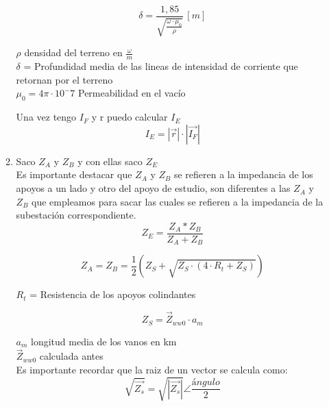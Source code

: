 \documentclass[10pt,a4paper]{article}
\begin{document}
\begin{itemize}
\begin{enumerate}
        $$
        \delta=\frac{1,85}{\sqrt{\frac{\omega \cdot \mu_{0}}{\rho}}} \,[m]
        $$
        
        $\rho$ densidad del terreno en $\frac{\omega}{m}$\\
        $\delta$ = Profundidad media de las lineas de intensidad de corriente que retornan por el terreno \\
        $\mu_{0} = 4\pi\cdot10^-7$ Permeabilidad en el vacío
        
        Una vez tengo $I_F$ y r puedo calcular $I_E$
        $$I_E = \left|\vec{r}\right| \cdot \left|\vec{I_F}\right|$$
        
        \item Saco $Z_A$ y $Z_B$ y con ellas saco $Z_E$
        \\
        
        Es importante destacar que $Z_A$ y $Z_B$ se refieren a la impedancia de los apoyos a un lado y otro del apoyo de estudio, son diferentes a las $Z_A$ y $Z_B$ que empleamos para sacar  las cuales se refieren a la impedancia de la subestación correspondiente.
        $$
        Z_{E}=\frac{Z_{A} * Z_{B}}{Z_{A}+Z_{B}}
        $$
        
        $$
        Z_{A}=Z_{B}=\frac{1}{2}\left(Z_{S}+\sqrt{Z_{S} \cdot\left(4 \cdot R_{t}+Z_{S}\right)}\right)
        $$
        
        $R_t$ = Resistencia de los apoyos colindantes
        
        $$
        Z_{S}=\vec{Z}_{w w 0} \cdot a_{m}
        $$
        
        $a_{m}$ longitud media de los vanos en km \\
        $\vec{Z}_{w w 0}$ calculada antes
        \\
        
        Es importante recordar que la raiz de un vector se calcula como:
        $$\sqrt{\vec{Z_s}} = \sqrt{\left | \vec{Z_s} \right |} \angle \frac{ángulo}{2}$$
    

\end{enumerate}
\end{itemize}
\end{document}
